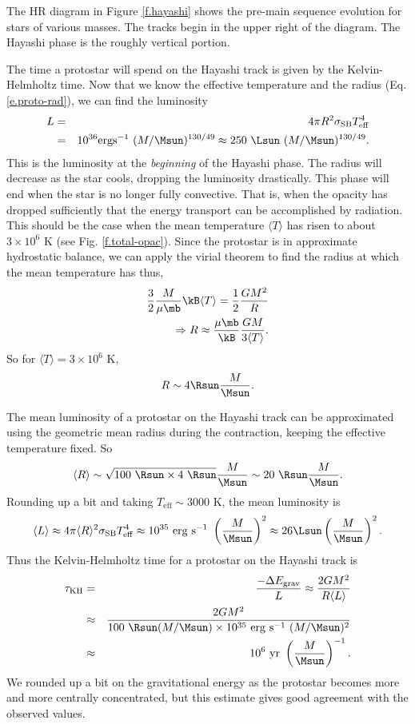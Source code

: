The HR diagram in Figure \ref{f.hayashi} shows the pre-main sequence evolution for stars of various masses.
The tracks begin in the upper right of the diagram.
The Hayashi phase is the roughly vertical portion.

The time a protostar will spend on the Hayashi track is given by the Kelvin-Helmholtz time.
Now that we know the effective temperature and the radius (Eq. \ref{e.proto-rad}), we can find the luminosity
\begin{eqnarray*}
  L &=& 4\pi R^2 \sigma_\mathrm{SB} T_\mathrm{eff}^4 \\
    &=& 10^{36} \mathrm{erg s^{-1}}\ (M/\Msun)^{130/49} \approx 250\ \Lsun\ (M/\Msun)^{130/49}.
\end{eqnarray*}
This is the luminosity at the {\it beginning} of the Hayashi phase.
The radius will decrease as the star cools, dropping the luminosity drastically.
This phase will end when the star is no longer fully convective.
That is, when the opacity has dropped sufficiently that the energy transport can be accomplished by radiation.
This should be the case when the mean temperature $\langle T\rangle$ has risen to about $3\times10^6$ K (see Fig. \ref{f.total-opac}).
Since the protostar is in approximate hydrostatic balance, we can apply the virial theorem to find the radius at which the mean temperature has thus,
\begin{eqnarray}
  \frac{3}{2}\frac{M}{\mu \mb} \kB \langle T\rangle = \frac{1}{2}\frac{GM^2}{R}\nonumber\\
  \Rightarrow R \approx \frac{\mu \mb}{\kB}\frac{GM}{3\langle T\rangle}.
\end{eqnarray}
So for $\langle T\rangle = 3\times10^6$ K,
\begin{equation}
  R \sim 4\Rsun \frac{M}{\Msun}.
\end{equation}

The mean luminosity of a protostar on the Hayashi track can be approximated using the geometric mean radius during the contraction, keeping the effective temperature fixed.
So
\[ \langle R\rangle \sim \sqrt{100\ \Rsun \times 4\ \Rsun}\frac{M}{\Msun} \sim 20\ \Rsun\frac{M}{\Msun}.\]
Rounding up a bit and taking $T_\mathrm{eff}\sim3000$ K, the mean luminosity is
\[\langle L \rangle \approx 4\pi\langle R\rangle^2 \sigma_\mathrm{SB} T_\mathrm{eff}^4 \approx 10^{35}\ \mathrm{erg\ s^{-1}}\ \left(\frac{M}{\Msun}\right)^2\approx 26 \Lsun \left(\frac{M}{\Msun}\right)^2. \]
Thus the Kelvin-Helmholtz time for a protostar on the Hayashi track is
\begin{eqnarray}
  \tau_\mathrm{KH} &=& \frac{-\Delta E_\mathrm{grav}}{L} \approx \frac{2GM^2}{R\langle L\rangle}\nonumber\\
  &\approx& \frac{2GM^2}{100\ \Rsun (M/\Msun) \times 10^{35}\ \mathrm{erg\ s^{-1}}\ (M/\Msun)^2}\nonumber\\
  &\approx& 10^6\ \mathrm{yr}\ \left(\frac{M}{\Msun}\right)^{-1}.
\end{eqnarray}
We rounded up a bit on the gravitational energy as the protostar becomes more and more centrally concentrated, but this estimate gives good agreement with the observed values.



